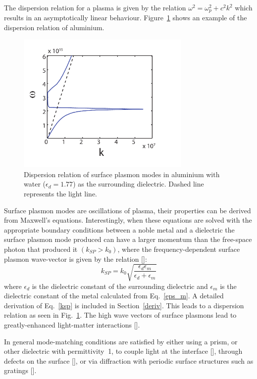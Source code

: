 The dispersion relation for a plasma is given by the relation $\omega^2 = \omega_p^2+c^2k^2$ which results in an asymptotically linear behaviour. Figure~\ref{dispRelation} shows an example of the dispersion relation of aluminium.
\begin{figure}[h!t]
\centering
\includegraphics[width=0.75\textwidth]{dispRelation.pdf}
\caption{Dispersion relation of surface plasmon modes in aluminium with water ($\epsilon_d=1.77$) as the surrounding dielectric. Dashed line represents the light line.}
\label{dispRelation}
\end{figure}

Surface plasmon modes are oscillations of plasma, their properties can be derived from Maxwell's equations. Interestingly, when these equations are solved with the appropriate boundary conditions between a noble metal and a dielectric the surface plasmon mode produced can have a larger momentum than the free-space photon that produced it $(k_{SP}>k_0)$, where the frequency-dependent surface plasmon wave-vector is given by the relation [\cite{Sambles}]:
\begin{equation}
k_{SP} = k_0\sqrt{\frac{\epsilon_d\epsilon_m}{\epsilon_d+\epsilon_m}}
\label{ksp}
\end{equation}
where $\epsilon_d$ is the dielectric constant of the surrounding dielectric and $\epsilon_m$ is the dielectric constant of the metal calculated from Eq.~\ref{eps_m}. A detailed derivation of Eq.~\ref{ksp} is included in Section~\ref{deriv}. This leads to a dispersion relation as seen in Fig.~\ref{dispRelation}. The high wave vectors of surface plasmons lead to greatly-enhanced light-matter interactions [\cite{Todorov}].

In general mode-matching conditions are satisfied by either using a prism, or other dielectric with permittivity $\>$1, to couple light at the interface [\cite{Kretschmann}], through defects on the surface [\cite{Hecht}], or via diffraction with periodic surface structures such as gratings [\cite{Ritchie}].

